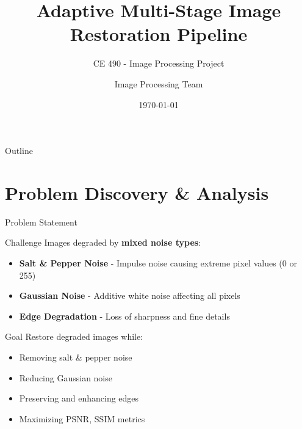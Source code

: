 \documentclass[aspectratio=169]{beamer}
\title[Image Restoration Pipeline]{Adaptive Multi-Stage Image Restoration Pipeline}
\subtitle{CE 490 - Image Processing Project}
\author{Image Processing Team}
\institute{Computer Engineering Department}
\date{\today}
\begin{document}
\begin{frame}
    \titlepage
\end{frame}

\begin{frame}{Outline}
    \tableofcontents
\end{frame}

\section{Problem Discovery \& Analysis}

\begin{frame}{Problem Statement}
    \begin{block}{Challenge}
        Images degraded by \textbf{mixed noise types}:
        \begin{itemize}
            \item \textbf{Salt \& Pepper Noise} - Impulse noise causing extreme pixel values (0 or 255)
            \item \textbf{Gaussian Noise} - Additive white noise affecting all pixels
            \item \textbf{Edge Degradation} - Loss of sharpness and fine details
        \end{itemize}
    \end{block}
    
    \begin{alertblock}{Goal}
        Restore degraded images while:
        \begin{itemize}
            \item Removing salt \& pepper noise
            \item Reducing Gaussian noise
            \item Preserving and enhancing edges
            \item Maximizing PSNR, SSIM metrics
        \end{itemize}
    \end{alertblock}
\end{frame}
\end{document}
